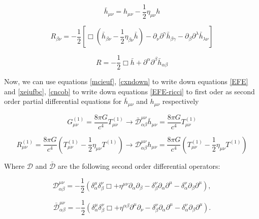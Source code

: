 \begin{equation}
\bar{h}_{\mu\nu} = h_{\mu\nu}-\frac{1}{2} \eta_{\mu\nu} h
\end{equation}

\begin{equation}\label{xeiufbc}
R_{\beta \nu} = -\frac{1}{2} [ \Box( \bar{h}_{\beta \nu}-\frac{1}{2} \eta_{\beta \nu} \bar{h} ) - \partial_{\nu} \partial^{\gamma} \bar{h}_{\beta \gamma} - \partial_{\beta} \partial^{\lambda} \bar{h}_{\lambda \nu} ]
\end{equation}

\begin{equation}\label{cncob}
R = -\frac{1}{2} \Box \bar{h} + \partial^{\alpha}\partial^{\beta} \bar{h}_{\alpha \beta}
\end{equation}


Now, we can use equations \ref{mcieuf}, \ref{cxndown} to write down equations \ref{EFE} and  \ref{xeiufbc}, \ref{cncob} to write down equations \ref{EFE-ricci} to first oder as second order partial differential equations for $\bar{h}_{\mu \nu}$ and $h_{\mu\nu}$ respectively

\begin{equation}\label{hbar}
G^{(1)}_{\mu\nu} = \frac{8\pi G}{c^4} T^{(1)}_{\mu\nu} \rightarrow \bar{\mathcal{D}}^{\mu\nu}_{\alpha \beta} \bar{h}_{\mu\nu} = \frac{8\pi G}{c^4} T^{(1)}_{\mu\nu}
\end{equation}


\begin{equation}\label{h}
R^{(1)}_{\mu\nu} = \frac{8\pi G}{c^4}(T^{(1)}_{\mu\nu} - \frac{1}{2} \eta_{\mu\nu}T^{(1)}) \rightarrow \mathcal{D}^{\mu\nu}_{\alpha \beta} h_{\mu\nu} = \frac{8\pi G}{c^4}(T^{(1)}_{\mu\nu} - \frac{1}{2} \eta_{\mu\nu}T^{(1)})
\end{equation}


Where $\mathcal{D}$ and $\mathcal{\bar{D}}$ are the following second order differential operators:

\begin{equation}\label{D}
\mathcal{D}^{\mu\nu}_{\alpha \beta} = -\frac{1}{2}( \delta^{\mu}_{\alpha} \delta^{\nu}_{\beta} \Box + \eta^{\mu\nu}\partial_{\alpha}\partial_{\beta} - \delta^{\nu}_{\beta} \partial_{\alpha}\partial^{\mu} - \delta^{\nu}_{\alpha} \partial_{\beta}\partial^{\mu}),
\end{equation}

\begin{equation}\label{Dbar}
\bar{\mathcal{D}}^{\mu\nu}_{\alpha \beta} = -\frac{1}{2}( \delta^{\mu}_{\alpha} \delta^{\nu}_{\beta} \Box + \eta^{\alpha \beta}\partial^{\mu}\partial_{\nu} - \delta^{\nu}_{\beta} \partial_{\alpha}\partial^{\mu} - \delta^{\nu}_{\alpha} \partial_{\beta}\partial^{\mu}).
\end{equation}


